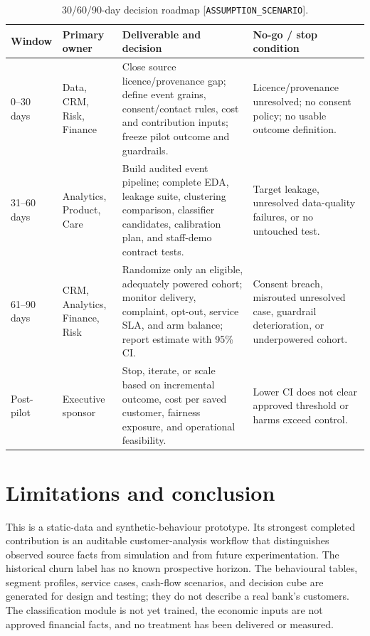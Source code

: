 \documentclass[a4paper,12pt]{article}
\newcommand{\scenario}{\texttt{ASSUMPTION\_SCENARIO}}
\begin{document}
\begin{table}[H]
\centering
\caption{30/60/90-day decision roadmap [\scenario].}
\label{tab:roadmap}
\small
\begin{tabularx}{\textwidth}{P{0.17\textwidth}P{0.25\textwidth}Y P{0.20\textwidth}}
\toprule
\textbf{Window} & \textbf{Primary owner} & \textbf{Deliverable and decision} & \textbf{No-go / stop condition}\\
--30 days & Data, CRM, Risk, Finance & Close source licence/provenance gap; define event grains, consent/contact rules, cost and contribution inputs; freeze pilot outcome and guardrails. & Licence/provenance unresolved; no consent policy; no usable outcome definition.\\
31--60 days & Analytics, Product, Care & Build audited event pipeline; complete EDA, leakage suite, clustering comparison, classifier candidates, calibration plan, and staff-demo contract tests. & Target leakage, unresolved data-quality failures, or no untouched test.\\
61--90 days & CRM, Analytics, Finance, Risk & Randomize only an eligible, adequately powered cohort; monitor delivery, complaint, opt-out, service SLA, and arm balance; report estimate with 95\% CI. & Consent breach, misrouted unresolved case, guardrail deterioration, or underpowered cohort.\\
Post-pilot & Executive sponsor & Stop, iterate, or scale based on incremental outcome, cost per saved customer, fairness exposure, and operational feasibility. & Lower CI does not clear approved threshold or harms exceed control.\\
\bottomrule
\end{tabularx}
\end{table}

\section{Limitations and conclusion}

This is a static-data and synthetic-behaviour prototype. Its strongest completed contribution is an auditable customer-analysis workflow that distinguishes observed source facts from simulation and from future experimentation. The historical churn label has no known prospective horizon. The behavioural tables, segment profiles, service cases, cash-flow scenarios, and decision cube are generated for design and testing; they do not describe a real bank's customers. The classification module is not yet trained, the economic inputs are not approved financial facts, and no treatment has been delivered or measured.
\end{document}
